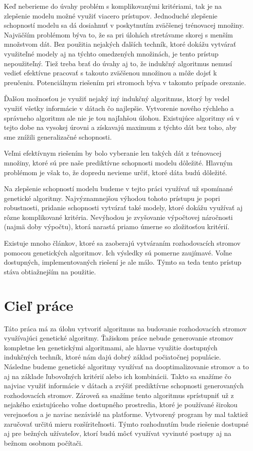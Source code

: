 Keď neberieme do úvahy problém s komplikovanými kritériami, tak je na zlepšenie modelu možné využiť viacero prístupov. Jednoduché zlepšenie schopností modelu sa dá dosiahnuť v poskytnutím zväčšenej trénovacej množiny. Najväčším problémom býva to, že sa pri úlohách stretávame skorej s menším množstvom dát. Bez použitia nejakých ďalších techník, ktoré dokážu vytvárať využiteľné modely aj na týchto omedzených množinách, je tento prístup nepoužiteľný. Tiež treba brať do úvahy aj to, že indukčný algoritmus nemusí vedieť efektívne pracovať s takouto zväčšenou množinou a môže dojsť k preučeniu. Potenciálnym riešením pri stromoch býva v takomto prípade orezanie.

Ďalšou možnosťou je využiť nejaký iný indukčný algoritmus, ktorý by vedel využiť všetky informácie v dátach čo najlepšie. Vytvorenie nového rýchleho a správneho algoritmu ale nie je tou najľahšou úlohou. Existujúce algoritmy sú v tejto dobe na vysokej úrovni a získavajú maximum z týchto dát bez toho, aby sme znížili generalizačné schopnosti.

Veľmi efektívnym riešením by bolo vyberanie len takých dát z trénovacej množiny, ktoré sú pre naše prediktívne schopnosti modelu dôležité. Hlavným problémom je však to, že dopredu nevieme určiť, ktoré dáta budú dôležité.

Na zlepšenie schopností modelu budeme v tejto práci využívať už spomínané genetické algoritmy. Najvýznamnejšou výhodou tohoto prístupu je popri robustnosti, pridanie schopnosti vytvárať také modely, ktoré dokážu využívať aj rôzne komp\-likované kritéria. Nevýhodou je zvyšovanie výpočtovej náročnosti (najmä doby výpočtu), ktorá narastá priamo úmerne so zložitosťou kritérií.

Existuje mnoho článkov, ktoré sa zaoberajú vytváraním rozhodovacích stromov pomocou genetických algoritmov. Ich výsledky sú pomerne zaujímavé. Voľne dostupných, implementovaných riešení je ale málo. Týmto sa teda tento prístup stáva obtiažnejším na použitie.
\section{Cieľ práce}
Táto práca má za úlohu vytvoriť algoritmus na budovanie rozhodovacích stromov využívajúci genetické algoritmy. Ťažiskom práce nebude generovanie stromov kompletne len genetickými algoritmami, ale hlavne využitie dostupných indukčných techník, ktoré nám dajú dobrý základ počiatočnej populácie. Následne budeme genetické algoritmy využívať na dooptimalizovanie stromov a to aj na základe ľubovoľných kritérií alebo ich kombinácii. Takto sa snažíme čo najviac využiť informácie v dátach a zvýšiť prediktívne schopnosti generovaných rozhodovacích stromov. Zároveň sa snažíme tento algoritmus sprístupniť už z nejakého existujúceho voľne dostupného prostredia, ktoré je používané širokou verejnosťou a je naviac nezávislé na platforme. Vytvorený program by mal taktiež zaručovať určitú mieru rozšíriteľnosti. Týmto rozhodnutím bude riešenie dostupné aj pre bežných užívateľov, ktorí budú môcť využívat vyvinuté postupy aj na bežnom osobnom počítači. 

